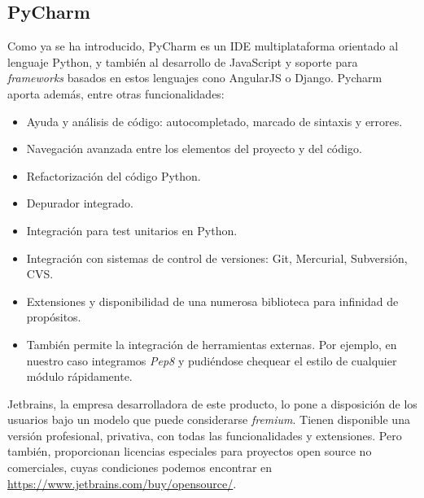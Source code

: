 \subsection{PyCharm}
\label{subsec:pycharm}

Como ya se ha introducido, PyCharm es un IDE multiplataforma orientado al lenguaje Python, y también al desarrollo de JavaScript y soporte para \textit{frameworks} basados en estos lenguajes cono AngularJS o Django. Pycharm aporta además, entre otras funcionalidades:

\begin{itemize}
\item Ayuda y análisis de código: autocompletado, marcado de sintaxis y errores.

\item Navegación avanzada entre los elementos del proyecto y del código.

\item Refactorización del código Python.

\item Depurador integrado.

\item Integración para test unitarios en Python.

\item Integración con sistemas de control de versiones: Git, Mercurial, Subversión, CVS.

\item Extensiones y disponibilidad de una numerosa biblioteca para infinidad de propósitos.

\item También permite la integración de herramientas externas. Por ejemplo, en nuestro caso integramos \textit{Pep8} y pudiéndose chequear el estilo de cualquier módulo rápidamente.
\end{itemize}

Jetbrains, la empresa desarrolladora de este producto, lo pone a disposición de los usuarios bajo un modelo que puede considerarse \textit{fremium}. Tienen disponible una versión profesional, privativa, con todas las funcionalidades y extensiones. Pero también, proporcionan licencias especiales para proyectos open source no comerciales, cuyas condiciones podemos encontrar en \space \url{https://www.jetbrains.com/buy/opensource/}.


